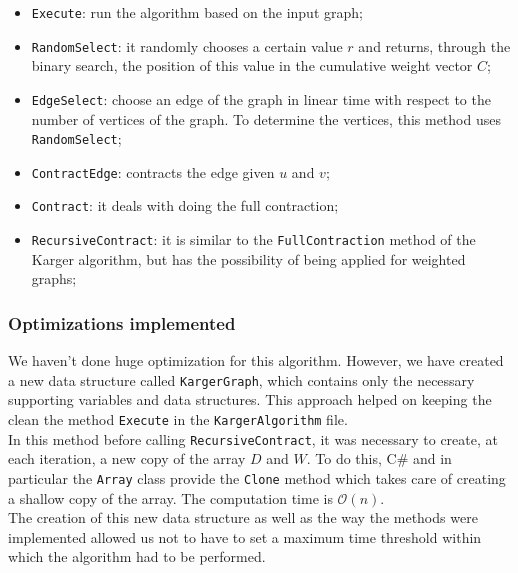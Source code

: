 \begin{itemize}
    \item \verb|Execute|: run the algorithm based on the input graph;
    \item \verb|RandomSelect|: it randomly chooses a certain value $r$ and returns, through the binary search, the position of this value in the cumulative weight vector $C$;
    \item \verb|EdgeSelect|: choose an edge of the graph in linear time with respect to the number of vertices of the graph. To determine the vertices, this method uses \verb|RandomSelect|;
    \item \verb|ContractEdge|: contracts the edge given $u$ and $v$;
    \item \verb|Contract|: it deals with doing the full contraction;
    \item \verb|RecursiveContract|: it is similar to the \verb|FullContraction| method of the Karger algorithm, but has the possibility of being applied for weighted graphs;
\end{itemize}

\subsubsection{Optimizations implemented}
We haven't done huge optimization for this algorithm. However, we have created a new data structure called \verb|KargerGraph|, which contains only the necessary supporting variables and data structures. This approach helped on keeping the clean the method \verb|Execute| in the \verb|KargerAlgorithm| file.\\
In this method before calling \verb|RecursiveContract|, it was necessary to create, at each iteration, a new copy of the array $D$ and $W$.
To do this, C\# and in particular the \verb|Array| class provide the \verb|Clone| method which takes care of creating a shallow copy of the array. The computation time is $\mathcal{O}(n)$. \\ \noindent
The creation of this new data structure as well as the way the methods were implemented allowed us not to have to set a maximum time threshold within which the algorithm had to be performed.
